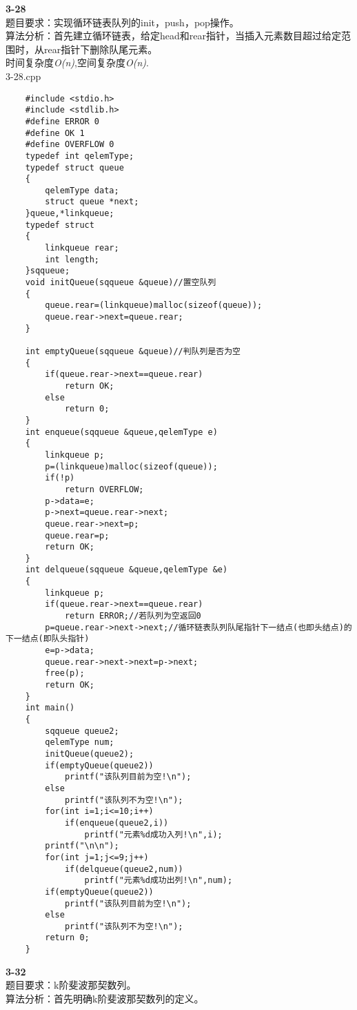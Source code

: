 \documentclass[UTF8,a4paper]{article}
\begin{document}
\textbf{3-28}\\
题目要求：实现循环链表队列的init，push，pop操作。\\
算法分析：首先建立循环链表，给定head和rear指针，当插入元素数目超过给定范围时，从rear指针下删除队尾元素。\\
时间复杂度\textit{O(n)},空间复杂度\textit{O(n)}.\\
3-28.cpp
\begin{lstlisting}
    #include <stdio.h>
    #include <stdlib.h>
    #define ERROR 0
    #define OK 1
    #define OVERFLOW 0
    typedef int qelemType;
    typedef struct queue
    {
        qelemType data;
        struct queue *next;
    }queue,*linkqueue;
    typedef struct
    {
        linkqueue rear;
        int length;
    }sqqueue;
    void initQueue(sqqueue &queue)//置空队列
    {
        queue.rear=(linkqueue)malloc(sizeof(queue));
        queue.rear->next=queue.rear;
    }
    
    int emptyQueue(sqqueue &queue)//判队列是否为空
    {
        if(queue.rear->next==queue.rear)
            return OK;
        else
            return 0;
    }
    int enqueue(sqqueue &queue,qelemType e)
    {
        linkqueue p;
        p=(linkqueue)malloc(sizeof(queue));
        if(!p)
            return OVERFLOW;
        p->data=e;
        p->next=queue.rear->next;
        queue.rear->next=p;
        queue.rear=p;
        return OK;
    }
    int delqueue(sqqueue &queue,qelemType &e)
    {
        linkqueue p;
        if(queue.rear->next==queue.rear)
            return ERROR;//若队列为空返回0
        p=queue.rear->next->next;//循环链表队列队尾指针下一结点(也即头结点)的下一结点(即队头指针)
        e=p->data;
        queue.rear->next->next=p->next;
        free(p);
        return OK;
    }
    int main()
    {
        sqqueue queue2;
        qelemType num;
        initQueue(queue2);
        if(emptyQueue(queue2))
            printf("该队列目前为空!\n");
        else
            printf("该队列不为空!\n");
        for(int i=1;i<=10;i++)
            if(enqueue(queue2,i))
                printf("元素%d成功入列!\n",i);
        printf("\n\n");
        for(int j=1;j<=9;j++)
            if(delqueue(queue2,num))
                printf("元素%d成功出列!\n",num);
        if(emptyQueue(queue2))
            printf("该队列目前为空!\n");
        else
            printf("该队列不为空!\n");
        return 0;
    }
\end{lstlisting}
\textbf{3-32}\\
题目要求：k阶斐波那契数列。\\
算法分析：首先明确k阶斐波那契数列的定义。
\end{document}
